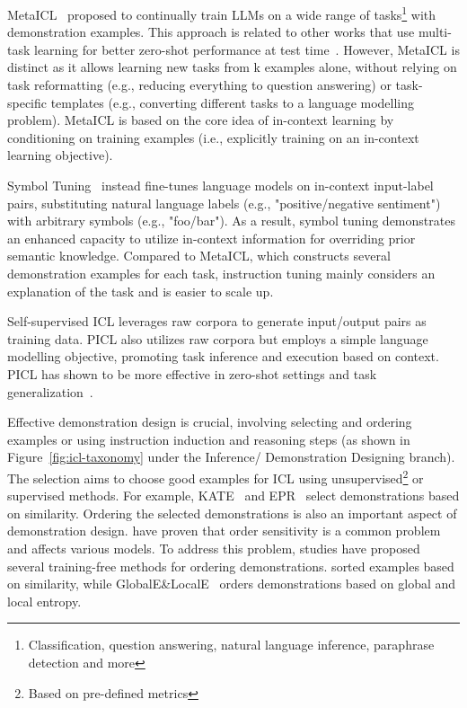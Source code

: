 MetaICL~\cite{min2022metaicl} proposed to continually train LLMs on a wide range of tasks\footnote{Classification, question answering,
	natural language inference, paraphrase detection and more} with demonstration examples.
This approach is related to other works that use multi-task learning for better zero-shot performance at test time~\cite{min2022metaicl}.
However, MetaICL is distinct as it allows learning new tasks from k examples alone, without relying on task reformatting (e.g., reducing everything to question answering)
or task-specific templates (e.g., converting different tasks to a language modelling problem).
MetaICL is based on the core idea of in-context learning by conditioning on training examples (i.e., explicitly training on an in-context learning objective).

Symbol Tuning~\cite{wei2023symbol} instead fine-tunes language models on in-context input-label pairs, substituting natural language labels (e.g., "positive/negative sentiment") with arbitrary symbols (e.g., "foo/bar").
As a result, symbol tuning demonstrates an enhanced capacity to utilize in-context information for overriding prior semantic knowledge.
Compared to MetaICL, which constructs several demonstration examples for each task, instruction tuning mainly considers an explanation of the task and is easier to scale up.

Self-supervised ICL leverages raw corpora to generate input/output pairs as training data. PICL also utilizes raw corpora but employs a simple language modelling objective, promoting task inference and execution based on context.
PICL has shown to be more effective in zero-shot settings and task generalization~\cite{dong2023survey}.

Effective demonstration design is crucial, involving selecting and ordering examples or using instruction induction and reasoning steps (as shown in Figure~\ref{fig:icl-taxonomy} under the Inference/ Demonstration Designing branch).
The selection aims to choose good examples for ICL using unsupervised\footnote{Based on pre-defined metrics} or supervised methods.
For example, KATE~\cite{liu2022good} and EPR~\cite{rubin2022learning} select demonstrations based on similarity.
Ordering the selected demonstrations is also an important aspect of demonstration design.
\textcite{lu2022fantastically} have proven that order sensitivity is a common problem and affects various models.
To address this problem, studies have proposed several training-free methods for ordering demonstrations.
\textcite{liu2022good} sorted examples based on similarity, while GlobalE\&LocalE~\cite{lu2022fantastically} orders demonstrations based on global and local entropy.


